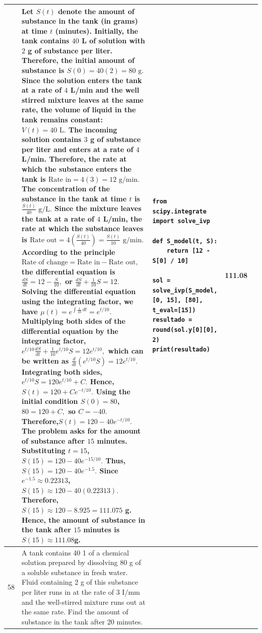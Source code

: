\documentclass[a4paper,12pt]{article}
\begin{document}
\begin{longtable}{|p{0.3cm}|p{}|p{10cm}|p{}|p{1.5cm}|}
              &Let $S(t)$ denote the amount of substance in the tank (in grams) at time $t$ (minutes).
Initially, the tank contains $40$ L of solution with $2$ g of substance per liter. Therefore, the initial amount of substance is
$S(0)=40(2)=80\text{ g}.$
Since the solution enters the tank at a rate of $4$ L/min and the well stirred mixture leaves at the same rate, the volume of liquid in the tank remains constant:
$V(t)=40\text{ L}.$
The incoming solution contains $3$ g of substance per liter and enters at a rate of $4$ L/min. Therefore, the rate at which the substance enters the tank is
$\text{Rate in}=4(3)=12\text{ g/min}.$
The concentration of the substance in the tank at time $t$ is
$\frac{S(t)}{40}\text{ g/L}.$
Since the mixture leaves the tank at a rate of $4$ L/min, the rate at which the substance leaves is
$\text{Rate out}=4\left(\frac{S(t)}{40}\right)
=\frac{S(t)}{10}\text{ g/min}.$
According to the principle
$\text{Rate of change}=\text{Rate in}-\text{Rate out},$
the differential equation is $\frac{dS}{dt}=12-\frac{S}{10},$
or $\frac{dS}{dt}+\frac{1}{10}S=12.$
Solving the differential equation using the integrating factor, we have
$\mu(t)=e^{\int\frac{1}{10}\,dt}=e^{t/10}.$
Multiplying both sides of the differential equation by the integrating factor,
$e^{t/10}\frac{dS}{dt}
+\frac{1}{10}e^{t/10}S
=12e^{t/10},$
which can be written as
$\frac{d}{dt}\left(e^{t/10}S\right)=12e^{t/10}.$
Integrating both sides, $e^{t/10}S=120e^{t/10}+C.$
Hence, $S(t)=120+Ce^{-t/10}.$
Using the initial condition $S(0)=80$,
$80=120+C,$ so $C=-40.$
Therefore,$S(t)=120-40e^{-t/10}.$
The problem asks for the amount of substance after $15$ minutes. Substituting $t=15$,
$S(15)=120-40e^{-15/10}.$
Thus, $S(15)=120-40e^{-1.5}.$
Since $e^{-1.5}\approx0.22313$,
$S(15)\approx120-40(0.22313).$
Therefore, $S(15)\approx120-8.925=111.075$ g.
Hence, the amount of substance in the tank after $15$ minutes is $S(15)\approx111.08 $g.
 &\begin{verbatim}
from scipy.integrate import solve_ivp

def S_model(t, S):
    return [12 - S[0] / 10]

sol = solve_ivp(S_model, [0, 15], [80], t_eval=[15])
resultado = round(sol.y[0][0], 2)
print(resultado)
\end{verbatim}& 111.08 \\ \hline 
 58           & A tank contains 40 1 of a chemical solution prepared by dissolving 80 g of a soluble substance in fresh water. Fluid
containing 2 g of this substance per liter runs in at the rate of 3 I/mm and the well-stirred mixture runs out at the same rate. Find the amount of substance in the tank after 20 minutes.



\end{longtable}
\end{document}
